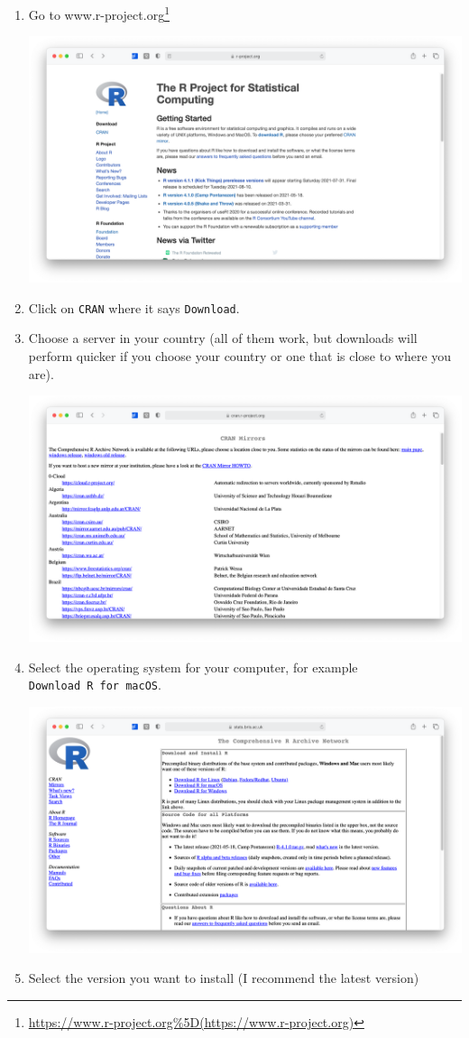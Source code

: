 \documentclass[
  letterpaper,
]{krantz}
\renewcommand{\href}[2]{#2\footnote{\url{#1}}}
\begin{document}
\begin{enumerate}
\def\labelenumi{\arabic{enumi}.}
\item
  Go to
  \href{https://www.r-project.org\%5D(https://www.r-project.org)}{www.r-project.org}

  \includegraphics{images/chapter_03_img/r_project/00_r_project_page.png}
\item
  Click on \texttt{CRAN} where it says \texttt{Download}.
\item
  Choose a server in your country (all of them work, but downloads will
  perform quicker if you choose your country or one that is close to
  where you are).

  \includegraphics{images/chapter_03_img/r_project/01_r_project_cran_mirror.png}
\item
  Select the operating system for your computer, for example
  \texttt{Download\ R\ for\ macOS}.

  \includegraphics{images/chapter_03_img/r_project/02_r_project_os_choice.png}
\item
  Select the version you want to install (I recommend the latest
  version)


\end{enumerate}
\end{document}
